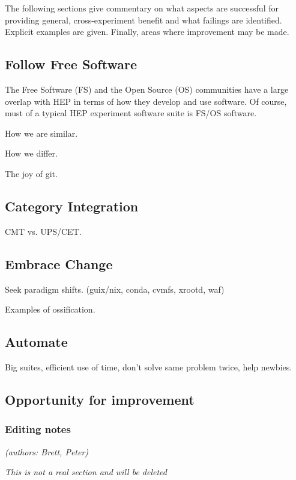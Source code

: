 The following sections give commentary on what aspects are successful
for providing general, cross-experiment benefit and what failings are
identified.  Explicit examples are given.  Finally, areas where
improvement may be made.

\subsection{Follow Free Software}

The Free Software (FS) and the Open Source (OS) communities have a
large overlap with HEP in terms of how they develop and use software.
Of course, must of a typical HEP experiment software suite is FS/OS
software.  

How we are similar.

How we differ.

The joy of git.

\subsection{Category Integration}

CMT vs. UPS/CET.

\subsection{Embrace Change}

Seek paradigm shifts. (guix/nix, conda, cvmfs, xrootd, waf)

Examples of ossification.

\subsection{Automate}

Big suites, efficient use of time, don't solve same problem twice, help newbies.

\subsection{Opportunity for improvement}



\subsubsection{Editing notes}

\textit{(authors: Brett, Peter)}

\textit{This is not a real section and will be deleted}

